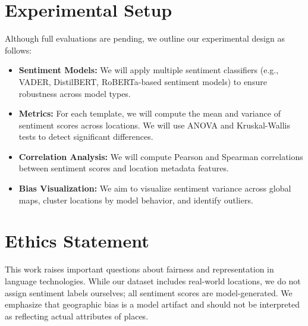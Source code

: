 \documentclass{article} %
\begin{document}
\section{Experimental Setup}
Although full evaluations are pending, we outline our experimental design as follows:
\begin{itemize}
  \item \textbf{Sentiment Models:} We will apply multiple sentiment classifiers (e.g., VADER, DistilBERT, RoBERTa-based sentiment models) to ensure robustness across model types.
  \item \textbf{Metrics:} For each template, we will compute the mean and variance of sentiment scores across locations. We will use ANOVA and Kruskal-Wallis tests to detect significant differences.
  \item \textbf{Correlation Analysis:} We will compute Pearson and Spearman correlations between sentiment scores and location metadata features.
  \item \textbf{Bias Visualization:} We aim to visualize sentiment variance across global maps, cluster locations by model behavior, and identify outliers.
\end{itemize}

\section*{Ethics Statement}
This work raises important questions about fairness and representation in language technologies. While our dataset includes real-world locations, we do not assign sentiment labels ourselves; all sentiment scores are model-generated. We emphasize that geographic bias is a model artifact and should not be interpreted as reflecting actual attributes of places.



\end{document}
